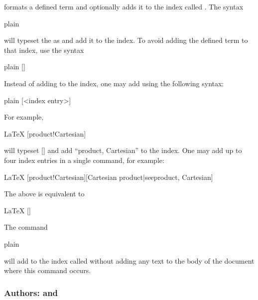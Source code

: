  formats a defined term and optionally adds it to the index called . The syntax
\begin{snippet}{plain}
\end{snippet}
will typeset the  as  and add it to the  index. To avoid adding the defined term to that index, use the syntax
\begin{snippet}{plain}
[]
\end{snippet}
Instead of adding  to the  index, one may add  using the following syntax:
\begin{snippet}{plain}
[<index entry>]
\end{snippet}
For example,
\begin{snippet}{LaTeX}
[product!Cartesian]
\end{snippet}
will typeset [] and add ``product, Cartesian'' to the  index. One may add up to four index entries in a single  command, for example:
\begin{snippet}{LaTeX}
[product!Cartesian][Cartesian product|see{product, Cartesian}]
\end{snippet}
The above is equivalent to
\begin{snippet}{LaTeX}
[]
\end{snippet}
The command
\begin{snippet}{plain}
\end{snippet}
will add  to the index called  without adding any text to the body of the document where this command occurs.

\subsubsection{Authors: \code{\\anauthor} and \code{\\authorsindexentry}}

